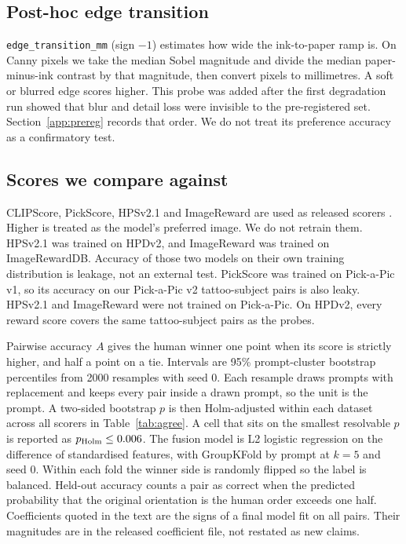 \subsection{Post-hoc edge transition}
\texttt{edge\_transition\_mm} (sign $-1$) estimates how wide the ink-to-paper ramp is.
On Canny pixels we take the median Sobel magnitude and divide the median paper-minus-ink contrast by that magnitude, then convert pixels to millimetres.
A soft or blurred edge scores higher.
This probe was added after the first degradation run showed that blur and detail loss were invisible to the pre-registered set.
Section~\ref{app:prereg} records that order.
We do not treat its preference accuracy as a confirmatory test.

\subsection{Scores we compare against}
CLIPScore, PickScore, HPSv2.1 and ImageReward are used as released scorers \citep{hessel2021clipscore,kirstain2023pickapic,wu2023hpsv2,xu2023imagereward}.
Higher is treated as the model's preferred image.
We do not retrain them.
HPSv2.1 was trained on HPDv2, and ImageReward was trained on ImageRewardDB.
Accuracy of those two models on their own training distribution is leakage, not an external test.
PickScore was trained on Pick-a-Pic v1, so its accuracy on our Pick-a-Pic v2 tattoo-subject pairs is also leaky.
HPSv2.1 and ImageReward were not trained on Pick-a-Pic.
On HPDv2, every reward score covers the same tattoo-subject pairs as the probes.

Pairwise accuracy $A$ gives the human winner one point when its score is strictly higher, and half a point on a tie.
Intervals are 95\% prompt-cluster bootstrap percentiles from 2000 resamples with seed 0.
Each resample draws prompts with replacement and keeps every pair inside a drawn prompt, so the unit is the prompt.
A two-sided bootstrap $p$ is then Holm-adjusted within each dataset across all scorers in Table~\ref{tab:agree}.
A cell that sits on the smallest resolvable $p$ is reported as $p_{\mathrm{Holm}}\le0.006$.
The fusion model is L2 logistic regression on the difference of standardised features, with GroupKFold by prompt at $k{=}5$ and seed 0.
Within each fold the winner side is randomly flipped so the label is balanced.
Held-out accuracy counts a pair as correct when the predicted probability that the original orientation is the human order exceeds one half.
Coefficients quoted in the text are the signs of a final model fit on all pairs.
Their magnitudes are in the released coefficient file, not restated as new claims.

